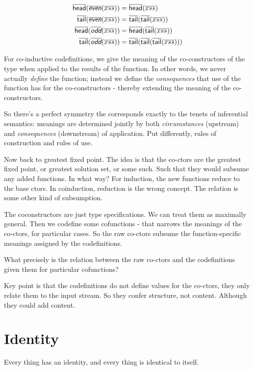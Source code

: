 \documentclass{article}
\begin{document}
\begin{align}
  \cohead(\codefn{even}(\coseq{xs})) & = \cohead(\coseq{xs}) \\
  \cotail(\codefn{even}(\coseq{xs})) & = \cotail(\cotail(\coseq{xs})) \\
  \cohead(\codefn{odd}(\coseq{xs})) & = \cohead(\cotail(\coseq{xs})) \\
  \cotail(\codefn{odd}(\coseq{xs})) & = \cotail(\cotail(\cotail(\coseq{xs})))
\end{align}

For co-inductive codefinitions, we give the meaning of the
co-constructors of the type when applied to the results of the
function. In other words, we never actually \textit{define} the
function; instead we define the \textit{consequences} that use of the
function has for the co-constructors - thereby extending the meaning
of the co-constructors.

So there's a perfect symmetry the corresponds exactly to the tenets of
inferential semantics: meanings are determined jointly by both
\textit{circumstances} (upstream) and \textit{consequences}
(downstream) of application. Put differently, rules of construction
and rules of use.

Now back to greatest fixed point. The idea is that the co-ctors are
the greatest fixed point, or greatest solution set, or some such. Such
that they would subsume any added functions. In what way? For
induction, the new functions reduce to the base ctors. In coinduction,
reduction is the wrong concept. The relation is some other kind of
subsumption.

The coconstructors are just type specifications. We can treat them as
maximally general. Then we codefine some cofunctions - that narrows
the meanings of the co-ctors, for particular cases. So the raw
co-ctors subsume the function-specific meanings assigned by the
codefinitions.

What precisely is the relation between the raw co-ctors and the
codefinitions given them for particular cofunctions?

Key point is that the codefinitions do not define values for the
co-ctors, they only relate them to the input stream. So they confer
structure, not content.  Although they could add content.

\section{Identity}
Every thing has an identity, and every thing is identical to itself.
\end{document}
